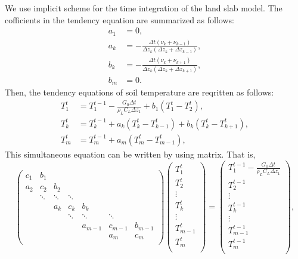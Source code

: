 We use implicit scheme for the time integration of the land slab model.
The cofficients in the tendency equation are summarized as follows:
\begin{align}
  a_{1} &= 0, \\
  a_{k} &= - \frac{\Delta t(\nu_{k}+\nu_{k-1})}{\Delta z_{k}(\Delta z_{k}+\Delta z_{k-1})}, \\
  b_{k} &= - \frac{\Delta t(\nu_{k}+\nu_{k+1})}{\Delta z_{k}(\Delta z_{k}+\Delta z_{k+1})}, \\
  b_{m} &= 0.
\end{align}
Then, the tendency equations of soil temperature are reqritten as follows:
\begin{align}
  T_{1}^{t} &= T_{1}^{t-1} - \frac{G_{0}\Delta t}{\rho_{L}C_{L}\Delta z_{1}} + b_{1} (T_{1}^{t}-T_{2}^{t}), \\
  T_{k}^{t} &= T_{k}^{t-1} + a_{k} (T_{k}^{t}-T_{k-1}^{t}) + b_{k} (T_{k}^{t}-T_{k+1}^{t}), \\
  T_{m}^{t} &= T_{m}^{t-1} + a_{m} (T_{m}^{t}-T_{m-1}^{t}),
\end{align}
This simultaneous equation can be written by using matrix. That is,
\begin{equation}
\begin{pmatrix}
  c_{1}  & b_{1}  &        &        &         &         &         \\
  a_{2}  & c_{2}  & b_{2}  &        &         &         &         \\
         & \ddots & \ddots & \ddots &         &         &         \\
         &        & a_{k}  & c_{k}  & b_{k}   &         &         \\
         &        &        & \ddots & \ddots  & \ddots  &         \\
         &        &        &        & a_{m-1} & c_{m-1} & b_{m-1} \\
         &        &        &        &         & a_{m}   & c_{m}   \\
\end{pmatrix}
\begin{pmatrix}
  T_{1}^{t}   \\
  T_{2}^{t}   \\
  \vdots      \\
  T_{k}^{t}   \\
  \vdots      \\
  T_{m-1}^{t} \\
  T_{m}^{t}   \\
\end{pmatrix}
=
\begin{pmatrix}
  T_{1}^{t-1} - \frac{G_{0}\Delta t}{\rho_{L}C_{L}\Delta z_{1}} \\
  T_{2}^{t-1}   \\
  \vdots        \\
  T_{k}^{t-1}   \\
  \vdots        \\
  T_{m-1}^{t-1} \\
  T_{m}^{t-1}   \\
\end{pmatrix}
,
\end{equation}
